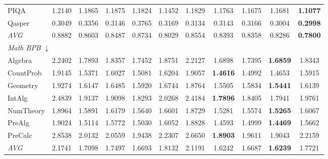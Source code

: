 \begin{table}[htbp]
\begin{tabular}{lcccccccccc}
PIQA & 1.2140 & 1.1865 & 1.1875 & 1.1824 & 1.1452 & 1.1829 & 1.1763 & 1.1675 & 1.1681 & \textbf{1.1077} \\
Qasper & 0.3049 & 0.3356 & 0.3146 & 0.3765 & 0.3169 & 0.3134 & 0.3143 & 0.3166 & 0.3004 & \textbf{0.2998} \\
\textit{AVG} & 0.8882 & 0.8603 & 0.8487 & 0.8734 & 0.8029 & 0.8554 & 0.8393 & 0.8358 & 0.8286 & \textbf{0.7800} \\
\midrule
\multicolumn{11}{l}{\textit{Math BPB} $\downarrow$} \\
Algebra & 2.2402 & 1.7893 & 1.8357 & 1.7452 & 1.8751 & 2.2127 & 1.6898 & 1.7395 & \textbf{1.6859} & 1.8343 \\
CountProb & 1.9145 & 1.5371 & 1.6027 & 1.5081 & 1.6204 & 1.9057 & \textbf{1.4616} & 1.4992 & 1.4653 & 1.5915 \\
Geometry & 1.9274 & 1.6147 & 1.6485 & 1.5920 & 1.6744 & 1.8764 & 1.5505 & 1.5834 & \textbf{1.5441} & 1.6139 \\
IntAlg & 2.4839 & 1.9137 & 1.9098 & 1.8293 & 2.0268 & 2.4184 & \textbf{1.7896} & 1.8405 & 1.7941 & 1.9761 \\
NumTheory & 1.8964 & 1.5891 & 1.6179 & 1.5640 & 1.6601 & 1.8729 & 1.5281 & 1.5574 & \textbf{1.5265} & 1.6067 \\
PreAlg & 1.9024 & 1.5114 & 1.5772 & 1.5030 & 1.6052 & 1.8828 & 1.4593 & 1.4999 & \textbf{1.4469} & 1.5662 \\
PreCalc & 2.8538 & 2.0132 & 2.0559 & 1.9438 & 2.2307 & 2.6650 & \textbf{1.8903} & 1.9611 & 1.9043 & 2.2159 \\
\textit{AVG} & 2.1741 & 1.7098 & 1.7497 & 1.6693 & 1.8132 & 2.1191 & 1.6242 & 1.6687 & \textbf{1.6239} & 1.7721 \\
\bottomrule
\end{tabular}
\end{table}